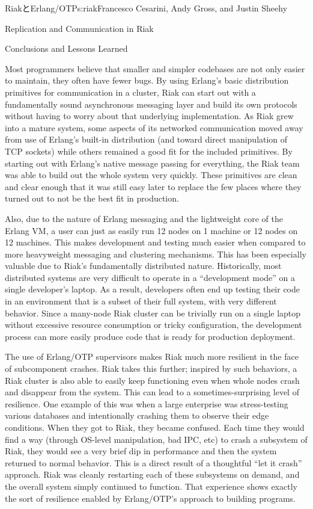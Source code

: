 \begin{aosachapter}{RiakとErlang/OTP}{s:riak}{Francesco Cesarini, Andy Gross, and Justin Sheehy}
\begin{aosasect1}{Replication and Communication in Riak}
\end{aosasect1}

\begin{aosasect1}{Conclusions and Lessons Learned}

Most programmers believe that smaller and simpler codebases are not
only easier to maintain, they often have fewer bugs.  By using
Erlang's basic distribution primitives for communication in a cluster,
Riak can start out with a fundamentally sound asynchronous messaging
layer and build its own protocols without having to worry about that
underlying implementation. As Riak grew into a mature system, some
aspects of its networked communication moved away from use of Erlang's
built-in distribution (and toward direct manipulation of TCP sockets)
while others remained a good fit for the included primitives.  By
starting out with Erlang's native message passing for everything, the
Riak team was able to build out the whole system very quickly.  These
primitives are clean and clear enough that it was still easy later to
replace the few places where they turned out to not be the best fit in
production.

Also, due to the nature of Erlang messaging and the lightweight core
of the Erlang VM, a user can just as easily run 12 nodes on 1 machine
or 12 nodes on 12 machines. This makes development and testing much
easier when compared to more heavyweight messaging and clustering
mechanisms. This has been especially valuable due to Riak's
fundamentally distributed nature. Historically, most distributed
systems are very difficult to operate in a ``development mode'' on a
single developer's laptop. As a result, developers often end up
testing their code in an environment that is a subset of their full
system, with very different behavior. Since a many-node Riak cluster
can be trivially run on a single laptop without excessive resource
consumption or tricky configuration, the development process can more
easily produce code that is ready for production deployment.

The use of Erlang/OTP supervisors makes Riak much more resilient in
the face of subcomponent crashes. Riak takes this further; inspired by
such behaviors, a Riak cluster is also able to easily keep functioning
even when whole nodes crash and disappear from the system. This can
lead to a sometimes-surprising level of resilience.  One example of
this was when a large enterprise was stress-testing various databases
and intentionally crashing them to observe their edge conditions.
When they got to Riak, they became confused.  Each time they would
find a way (through OS-level manipulation, bad IPC, etc) to crash a
subsystem of Riak, they would see a very brief dip in performance and
then the system returned to normal behavior. This is a direct result
of a thoughtful ``let it crash'' approach. Riak was cleanly restarting
each of these subsystems on demand, and the overall system simply
continued to function. That experience shows exactly the sort of
resilience enabled by Erlang/OTP's approach to building programs.


\end{aosasect1}
\end{aosachapter}
